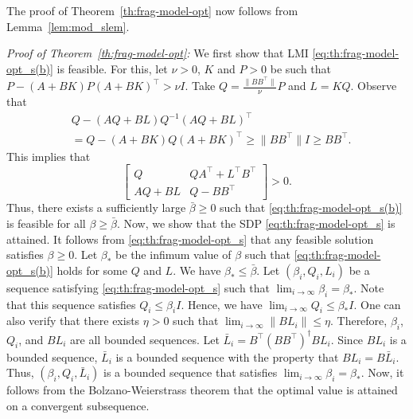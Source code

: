 \documentclass[9pt,shortpaper,twoside,web]{ieeecolor}
\begin{document}
The proof of Theorem~\ref{th:frag-model-opt} now follows from Lemma~\ref{lem:mod_slem}.

\textit{Proof of Theorem~\ref{th:frag-model-opt}:}
 We first show that LMI \eqref{eq:th:frag-model-opt_s(b)} is feasible. For this, let $\nu>0$, $K$ and $P>0$ be such that \mbox{$P-(A+BK)P(A+BK)^\top > \nu I$}. Take $Q=\frac{\|BB^\top\|}{\nu}P$ and \mbox{$L=KQ$}. Observe that 
\begin{equation}
\begin{split}
&Q-(AQ+BL)Q^{-1}(AQ+BL)^\top \\
&=Q-(A+BK)Q(A+BK)^\top\geq \|BB^\top\|I \geq BB^\top.
\end{split}
\end{equation} 
This implies that 
\begin{equation}
    \begin{bmatrix}
        Q & QA^\top+L^\top B^\top \\
AQ+BL & Q-BB^\top
    \end{bmatrix} > 0.
\end{equation} Thus, there exists a sufficiently large $\bar\beta \geq 0$ such that \eqref{eq:th:frag-model-opt_s(b)} is feasible for all $\beta\geq\bar \beta$. Now, we show that the SDP \eqref{eq:th:frag-model-opt_s} is attained. It follows from \eqref{eq:th:frag-model-opt_s} that any feasible solution satisfies $\beta \geq 0$. Let $\beta_*$ be the infimum value of $\beta$ such that \eqref{eq:th:frag-model-opt_s(b)} holds for some $Q$ and $L$. We have $\beta_*\leq\bar{\beta}$. Let $(\beta_i,Q_i,L_i)$ be a sequence satisfying \eqref{eq:th:frag-model-opt_s} such that $\lim_{i \rightarrow \infty} \beta_i=\beta_*$. Note that this sequence satisfies $Q_i\leq \beta_i I$. Hence, we have $\lim_{i \rightarrow \infty} Q_i\leq\beta_* I$. One can also verify that there exists $\eta>0$ such that $\lim_{i \rightarrow \infty} \|BL_i\|\leq \eta$. Therefore, $\beta_i$, $Q_i$, and $BL_i$ are all bounded sequences. Let $\bar{L}_i=B^\top (BB^\top)^\dagger BL_i$. Since $BL_i$ is a bounded sequence, $\bar{L}_i$ is a bounded sequence with the property that $BL_i=B\bar{L}_i$. Thus, $(\beta_i,Q_i,\bar{L}_i)$ is a bounded sequence that satisfies $\lim_{i \rightarrow \infty} \beta_i=\beta_*$. Now, it follows from the \mbox{Bolzano-Weierstrass} theorem that the optimal value is attained on a convergent subsequence.  
\end{document}

